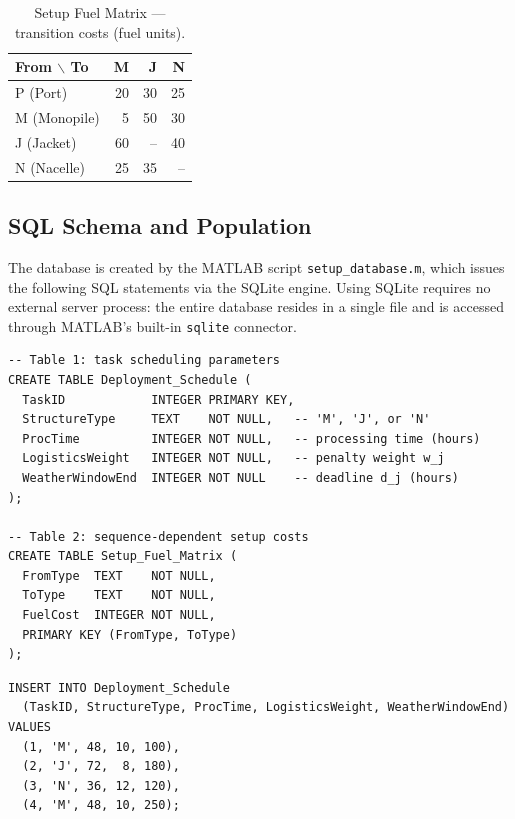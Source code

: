 \documentclass[11pt,a4paper]{article}
\begin{document}
\begin{table}[H]
\centering
\caption{Setup Fuel Matrix — transition costs (fuel units).}
\label{tab:setup}
\begin{tabular}{lrrr}
\toprule
\textbf{From $\backslash$ To} & \textbf{M} & \textbf{J} & \textbf{N} \\
\midrule
P (Port)   & 20 & 30 & 25 \\
M (Monopile) & 5  & 50 & 30 \\
J (Jacket)   & 60 & -- & 40 \\
N (Nacelle)  & 25 & 35 & -- \\
\bottomrule
\end{tabular}
\end{table}

\subsection{SQL Schema and Population}

The database is created by the MATLAB script \texttt{setup\_database.m},
which issues the following SQL statements via the SQLite engine. Using
SQLite requires no external server process: the entire database resides in
a single file and is accessed through MATLAB's built-in \texttt{sqlite}
connector.

\begin{lstlisting}[style=sqlstyle, caption={DDL: table creation.}]
-- Table 1: task scheduling parameters
CREATE TABLE Deployment_Schedule (
  TaskID            INTEGER PRIMARY KEY,
  StructureType     TEXT    NOT NULL,   -- 'M', 'J', or 'N'
  ProcTime          INTEGER NOT NULL,   -- processing time (hours)
  LogisticsWeight   INTEGER NOT NULL,   -- penalty weight w_j
  WeatherWindowEnd  INTEGER NOT NULL    -- deadline d_j (hours)
);

-- Table 2: sequence-dependent setup costs
CREATE TABLE Setup_Fuel_Matrix (
  FromType  TEXT    NOT NULL,
  ToType    TEXT    NOT NULL,
  FuelCost  INTEGER NOT NULL,
  PRIMARY KEY (FromType, ToType)
);
\end{lstlisting}

\begin{lstlisting}[style=sqlstyle, caption={DML: data insertion (Deployment\_Schedule).}]
INSERT INTO Deployment_Schedule
  (TaskID, StructureType, ProcTime, LogisticsWeight, WeatherWindowEnd)
VALUES
  (1, 'M', 48, 10, 100),
  (2, 'J', 72,  8, 180),
  (3, 'N', 36, 12, 120),
  (4, 'M', 48, 10, 250);
\end{lstlisting}
\end{document}
